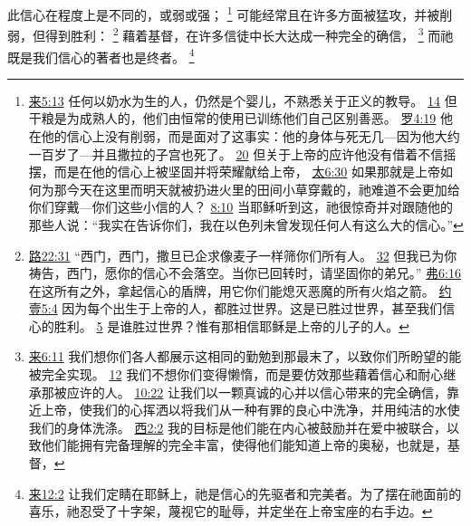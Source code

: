 \documentclass[12pt, a4paper, oneside]{ctexart}
\newcounter{parnum}[section]
\newcommand{\N}{%
   \noindent\refstepcounter{parnum}%
    \makebox[\parindent][l]{\textbf{\arabic{parnum}.}}}
\begin{document}
\N 此信心在程度上是不同的，或弱或强；
	\footnote {
		\href{https://biblehub.com/hebrews/5-13.htm}{来5:13} 任何以奶水为生的人，仍然是个婴儿，不熟悉关于正义的教导。
		\href{https://biblehub.com/hebrews/5-14.htm}{14} 但干粮是为成熟人的，他们由恒常的使用已训练他们自己区别善恶。
		\href{https://biblehub.com/romans/4-19.htm}{罗4:19} 他在他的信心上没有削弱，而是面对了这事实：他的身体与死无几---因为他大约一百岁了---并且撒拉的子宫也死了。
		\href{https://biblehub.com/romans/4-20.htm}{20} 但关于上帝的应许他没有借着不信摇摆，而是在他的信心上被坚固并将荣耀献给上帝，
		\href{https://biblehub.com/matthew/6-30.htm}{太6:30} 如果那就是上帝如何为那今天在这里而明天就被扔进火里的田间小草穿戴的，祂难道不会更加给你们穿戴---你们这些小信的人？
		\href{https://biblehub.com/matthew/8-10.htm}{8:10} 当耶稣听到这，祂很惊奇并对跟随他的那些人说：“我实在告诉你们，我在以色列未曾发现任何人有这么大的信心。”
	}
	可能经常且在许多方面被猛攻，并被削弱，但得到胜利：
	\footnote {
		\href{https://biblehub.com/luke/22-31.htm}{路22:31} “西门，西门，撒旦已企求像麦子一样筛你们所有人。
		\href{https://biblehub.com/luke/22-32.htm}{32} 但我已为你祷告，西门，愿你的信心不会落空。当你已回转时，请坚固你的弟兄。”
		\href{https://biblehub.com/ephesians/6-16.htm}{弗6:16} 在这所有之外，拿起信心的盾牌，用它你们能熄灭恶魔的所有火焰之箭。
		\href{https://biblehub.com/1_john/5-4.htm}{约壹5:4} 因为每个出生于上帝的人，都胜过世界。这是已胜过世界，甚至我们信心的胜利。
		\href{https://biblehub.com/1_john/5-5.htm}{5} 是谁胜过世界？惟有那相信耶稣是上帝的儿子的人。
	}
	藉着基督，在许多信徒中长大达成一种完全的确信，
	\footnote {
		\href{https://biblehub.com/hebrews/6-11.htm}{来6:11} 我们想你们各人都展示这相同的勤勉到那最末了，以致你们所盼望的能被完全实现。
		\href{https://biblehub.com/hebrews/6-12.htm}{12} 我们不想你们变得懒惰，而是要仿效那些藉着信心和耐心继承那被应许的人。
		\href{https://biblehub.com/hebrews/10-22.htm}{10:22} 让我们以一颗真诚的心并以信心带来的完全确信，靠近上帝，使我们的心挥洒以将我们从一种有罪的良心中洗净，并用纯洁的水使我们的身体洗涤。
		\href{https://biblehub.com/colossians/2-2.htm}{西2:2} 我的目标是他们能在内心被鼓励并在爱中被联合，以致他们能拥有完备理解的完全丰富，使得他们能知道上帝的奥秘，也就是，基督，
	}
	而祂既是我们信心的著者也是终者。
	\footnote {
		\href{https://biblehub.com/hebrews/12-2.htm}{来12:2} 让我们定睛在耶稣上，祂是信心的先驱者和完美者。为了摆在祂面前的喜乐，祂忍受了十字架，蔑视它的耻辱，并定坐在上帝宝座的右手边。
	}
\end{document}
